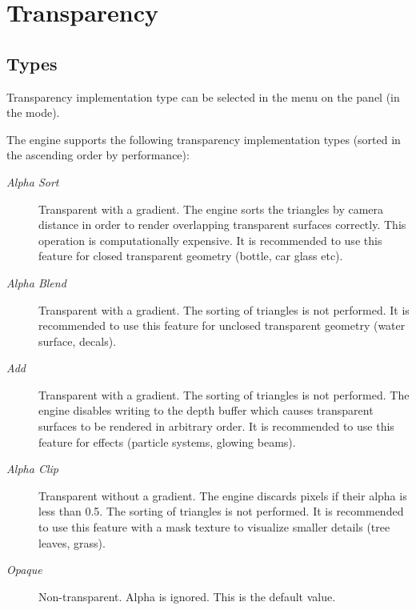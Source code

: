 \documentclass[a4paper,12pt,oneside]{sphinxmanual}
\begin{document}

\section{Transparency}
\label{materials:id3}\label{materials:index-2}

\subsection{Types}
\label{materials:id4}\label{materials:index-3}
Transparency implementation type can be selected in the  menu on the  panel (in the  mode).

The engine supports the following transparency implementation types (sorted in the ascending order by performance):
\begin{description}
\item[{\emph{Alpha Sort}}] \leavevmode
Transparent with a gradient. The engine sorts the triangles by camera distance in order to render overlapping transparent surfaces correctly. This operation is computationally expensive. It is recommended to use this feature for closed transparent geometry (bottle, car glass etc).

\item[{\emph{Alpha Blend}}] \leavevmode
Transparent with a gradient. The sorting of triangles is not performed. It is recommended to use this feature for unclosed transparent geometry (water surface, decals).

\item[{\emph{Add}}] \leavevmode
Transparent with a gradient. The sorting of triangles is not performed. The engine disables writing to the depth buffer which causes transparent surfaces to be rendered in arbitrary order. It is recommended to use this feature for effects (particle systems, glowing beams).

\item[{\emph{Alpha Clip}}] \leavevmode
Transparent without a gradient. The engine discards pixels if their alpha is less than 0.5. The sorting of triangles is not performed. It is recommended to use this feature with a mask texture to visualize smaller details (tree leaves, grass).

\item[{\emph{Opaque}}] \leavevmode
Non-transparent. Alpha is ignored. This is the default value.

\end{description}
\end{document}
